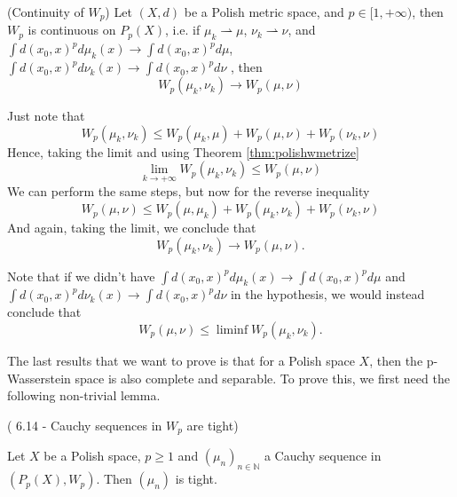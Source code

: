 \begin{corollary}(Continuity of $W_p$)
  Let $(X,d)$ be a Polish metric space, and $p \in [1,+\infty)$, then $W_p$ is continuous on $P_p(X)$, i.e.
  if $\mu_k \rightharpoonup \mu$, $\nu_k \rightharpoonup \nu$, and
  $\int d(x_0, x)^p d\mu_k(x) \to \int d(x_0,x)^p d\mu$,
  $\int d(x_0, x)^p d\nu_k(x) \to \int d(x_0,x)^p d\nu$
  , then
  \begin{equation}
    W_p(\mu_k,\nu_k) \to W_p(\mu,\nu)
  \end{equation}
\end{corollary}
\begin{prf}
  Just note that
  \begin{equation*}
    W_p(\mu_k,\nu_k) \leq W_p(\mu_k,\mu) + W_p(\mu,\nu) + W_p(\nu_k,\nu)
  \end{equation*}
  Hence, taking the limit and using Theorem \ref{thm:polishwmetrize}
  \begin{equation*}
    \lim_{k\to +\infty} 
    W_p(\mu_k,\nu_k) \leq  W_p(\mu,\nu)
  \end{equation*}
  We can perform the same steps, but now for the reverse inequality
  \begin{equation*}
    W_p(\mu,\nu) \leq W_p(\mu,\mu_k) + W_p(\mu_k,\nu_k) + W_p(\nu_k,\nu)
  \end{equation*}
  And again, taking the limit, we conclude that
  \begin{equation*}
    W_p(\mu_k,\nu_k) \to W_p(\mu,\nu).
  \end{equation*}

\end{prf}

Note that if we didn't have
  $\int d(x_0, x)^p d\mu_k(x) \to \int d(x_0,x)^p d\mu$ and
  $\int d(x_0, x)^p d\nu_k(x) \to \int d(x_0,x)^p d\nu$
in the hypothesis, we would instead conclude that
\begin{equation*}
  W_p(\mu,\nu)\leq \liminf W_p(\mu_k,\nu_k).
\end{equation*}

The last results that we want to prove is that for a Polish space $X$, then the
p-Wasserstein space is also complete and separable. To prove this, we first
need the following non-trivial lemma.

\begin{lemma}(\citet{villani2008optimal} 6.14 - Cauchy sequences in $W_p$ are tight)

  Let $X$ be a Polish space, $p \geq 1$ and $(\mu_n)_{n\in \mathbb N}$ a Cauchy sequence
  in $(P_p(X), W_p)$. Then $(\mu_n)$ is tight.
\end{lemma}

